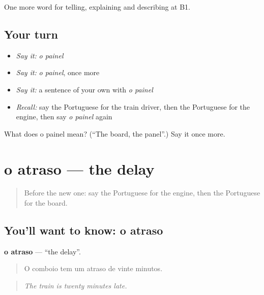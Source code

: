 \begin{grammarlens}[title={What you've built}]
One more word for telling, explaining and describing at B1.
\end{grammarlens}

\subsection*{Your turn}
\begin{itemize}
\raggedright
  \item \emph{Say it:} \emph{o painel}
  \item \emph{Say it:} \emph{o painel}, once more
  \item \emph{Say it:} a sentence of your own with \emph{o painel}
  \item \emph{Recall:} say the Portuguese for the train driver, then the Portuguese for the engine, then say \emph{o painel} again
\end{itemize}

\begin{tcolorbox}[breakable,colback=teal!4,colframe=teal!35!black,title={Before you move on}]
What does o painel mean? (\textquotedblleft{}The board, the panel\textquotedblright{}.) Say it once more.
\end{tcolorbox}
\section[o atraso]{o atraso — the delay}

\label{lesson:PT-C416-atraso}



\begin{quote}
Before the new one: say the Portuguese for the engine, then the Portuguese for the board.
\end{quote}

\subsection*{You'll want to know: o atraso}
\textbf{o atraso} — \textquotedblleft{}the delay\textquotedblright{}.

\begin{quote}
O comboio tem um atraso de vinte minutos.
\end{quote}

\begin{quote}
\emph{The train is twenty minutes late.}
\end{quote}


